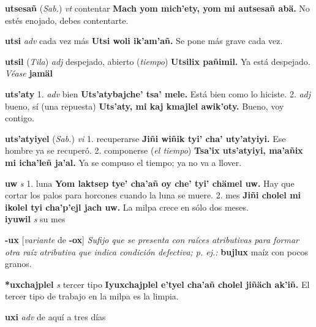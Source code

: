 \documentclass[10pt]{scrbook}
\newcommand{\entry}[1]{\textbf{#1}}
\newcommand{\onedefinition}[1]{#1.}
\newcommand{\nontranslationdef}[1]{\textit{#1}}
\newcommand{\partofspeech}[1]{\textit{#1}}
\newcommand{\spanishtranslation}[1]{#1}
\newcommand{\clarification}[1]{(\textit{#1})}
\newcommand{\cholexample}[1]{\textbf{#1}}
\newcommand{\exampletranslation}[1]{#1}
\newcommand{\alsosee}[1]{\\\textit{Véase} \textbf{#1}}
\newcommand{\relevantdialect}[1]{(\textit{#1})}
\newcommand{\secondaryentry}[1]{\\\textbf{#1}}
\newcommand{\secondpartofspeech}[1]{\textit{#1}}
\newcommand{\secondtranslation}[1]{#1}
\newcommand{\conjugationtense}[1]{[\textit{#1}}
\newcommand{\conjugationverb}[1]{de \textbf{#1}]}
\begin{document}
\begin{multicols}{2}
\entry{utsesañ}
\relevantdialect{Sab.}
\partofspeech{vt}
\spanishtranslation{contentar}
\cholexample{Mach yom mich'ety, yom mi autsesañ abä.}
\exampletranslation{No estés enojado, debes contentarte.}

\entry{utsi}
\partofspeech{adv}
\spanishtranslation{cada vez más}
\cholexample{Utsi woli ik'am'añ.}
\exampletranslation{Se pone más grave cada vez.}

\entry{utsil}
\relevantdialect{Tila}
\partofspeech{adj}
\spanishtranslation{despejado, abierto}
\clarification{tiempo}
\cholexample{Utsilix pañimil.}
\exampletranslation{Ya está despejado.}
\alsosee{jamäl}

\entry{uts'aty}
\onedefinition{1}
\partofspeech{adv}
\spanishtranslation{bien}
\cholexample{Uts'atybajche' tsa' mele.}
\exampletranslation{Está bien como lo hiciste.}
\onedefinition{2}
\partofspeech{adj}
\spanishtranslation{bueno, sí (una repuesta)}
\cholexample{Uts'aty, mi kaj kmajlel awik'oty.}
\exampletranslation{Bueno, voy contigo.}

\entry{uts'atyiyel}
\relevantdialect{Sab.}
\partofspeech{vi}
\onedefinition{1}
\spanishtranslation{recuperarse}
\cholexample{Jiñi wiñik tyi' cha' uty'atyiyi.}
\exampletranslation{Ese hombre ya se recuperó.}
\onedefinition{2}
\spanishtranslation{componerse}
\clarification{el tiempo}
\cholexample{Tsa'ix uts'atyiyi, ma'añix mi icha'leñ ja'al.}
\exampletranslation{Ya se compuso el tiempo; ya no va a llover.}

\entry{uw}
\partofspeech{s}
\onedefinition{1}
\spanishtranslation{luna}
\cholexample{Yom laktsep tye' cha'añ oy che' tyi' chämel uw.}
\exampletranslation{Hay que cortar los palos para horcones cuando la luna se muere.}
\onedefinition{2}
\spanishtranslation{mes}
\cholexample{Jiñi cholel mi ikolel tyi cha'p'ejl jach uw.}
\exampletranslation{La milpa crece en sólo dos meses.}
\secondaryentry{iyuwil}
\secondpartofspeech{s}
\secondtranslation{su mes}

\entry{-ux}
\conjugationtense{variante}
\conjugationverb{-ox}
\nontranslationdef{Sufijo que se presenta con raíces atributivas para formar otra raíz atributiva que indica condición defectiva; p. ej.:}
\cholexample{bujlux}
\exampletranslation{maíz con pocos granos.}

\entry{*uxchajplel}
\partofspeech{s}
\spanishtranslation{tercer tipo}
\cholexample{Iyuxchajplel e'tyel cha'añ cholel jiñäch ak'iñ.}
\exampletranslation{El tercer tipo de trabajo en la milpa es la limpia.}

\entry{uxi}
\partofspeech{adv}
\spanishtranslation{de aquí a tres días}


\end{multicols}
\end{document}
